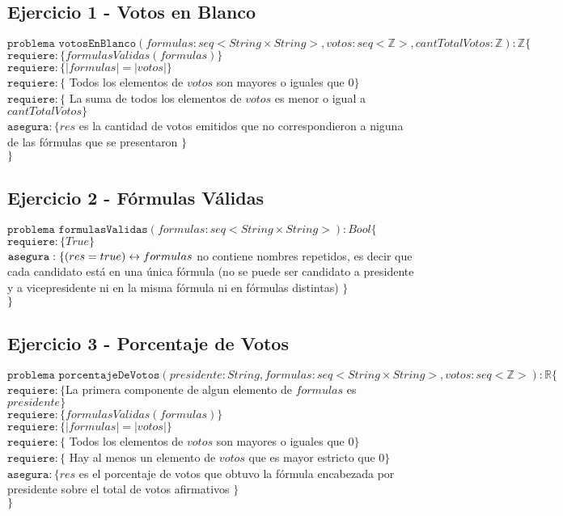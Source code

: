 	\subsection{Ejercicio 1 - Votos en Blanco}
	$\texttt{problema votosEnBlanco}(formulas:seq<String \times String>,votos:seq<\mathbb{Z}>,cantTotalVotos:\mathbb{Z}) : \mathbb{Z} \lbrace$\\
	$\texttt{requiere}:\lbrace formulasValidas(formulas) \rbrace$\\
	$\texttt{requiere}:\lbrace |formulas| = |votos| \rbrace$\\
	$\texttt{requiere}:\lbrace$ Todos los elementos de $votos$ son mayores o iguales que 0$\rbrace$\\
	$\texttt{requiere}:\lbrace$ La suma de todos los elementos de $votos$ es menor o igual a $cantTotalVotos \rbrace$\\
	$\texttt{asegura}:\lbrace res$ es la cantidad de votos emitidos que no correspondieron a niguna de las fórmulas que se presentaron $\rbrace$\\
	$\rbrace$
	
	\subsection{Ejercicio 2 - Fórmulas Válidas}
	$\texttt{problema formulasValidas}(formulas:seq<String \times String>) : Bool \lbrace$\\
	$\texttt{requiere}:\lbrace True \rbrace$\\
	$\texttt{asegura}:\lbrace (res=true)\leftrightarrow formulas$  no contiene nombres repetidos, es decir que cada candidato está en una única fórmula (no se puede ser candidato a presidente y a vicepresidente ni en la misma fórmula ni en fórmulas distintas) $\rbrace$\\
	$\rbrace$
	
	\subsection{Ejercicio 3 - Porcentaje de Votos}
	$\texttt{problema porcentajeDeVotos}(presidente:String,formulas:seq<String \times String>,votos:seq<\mathbb{Z}>) : \mathbb{R} \lbrace$\\
	$\texttt{requiere}:\lbrace $La primera componente de algun elemento de $formulas$ es $presidente \rbrace$\\
	$\texttt{requiere}:\lbrace formulasValidas(formulas) \rbrace$\\
	$\texttt{requiere}:\lbrace |formulas| = |votos| \rbrace$\\
	$\texttt{requiere}:\lbrace$ Todos los elementos de $votos$ son mayores o iguales que 0$\rbrace$\\
	$\texttt{requiere}:\lbrace$ Hay al menos un elemento de $votos$ que es mayor estricto que 0$\rbrace$\\
	$\texttt{asegura}:\lbrace res$ es el porcentaje de votos que obtuvo la fórmula encabezada por presidente sobre el total de votos afirmativos $\rbrace$\\
	$\rbrace$
	
